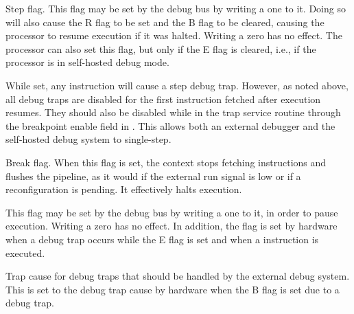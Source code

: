 \implementation{}

Step flag. This flag may be set by the debug bus by writing a one to it. Doing
so will also cause the R flag to be set and the B flag to be cleared, causing
the processor to resume execution if it was halted. Writing a zero has no
effect. The processor can also set this flag, but only if the E flag is cleared,
i.e., if the processor is in self-hosted debug mode.

While set, any instruction will cause a step debug trap. However, as noted
above, all debug traps are disabled for the first instruction fetched after
execution resumes. They should also be disabled while in the trap service
routine through the breakpoint enable field in . This allows both an
external debugger and the self-hosted debug system to single-step.

\implementation{}

Break flag. When this flag is set, the context stops fetching instructions and
flushes the pipeline, as it would if the external run signal is low or if a
reconfiguration is pending. It effectively halts execution.

This flag may be set by the debug bus by writing a one to it, in order to pause
execution. Writing a zero has no effect. In addition, the flag is set by
hardware when a debug trap occurs while the E flag is set and when a 
instruction is executed.

\implementation{}

Trap cause for debug traps that should be handled by the external debug system.
This is set to the debug trap cause by hardware when the B flag is set due to a
debug trap.

\implementation{}

